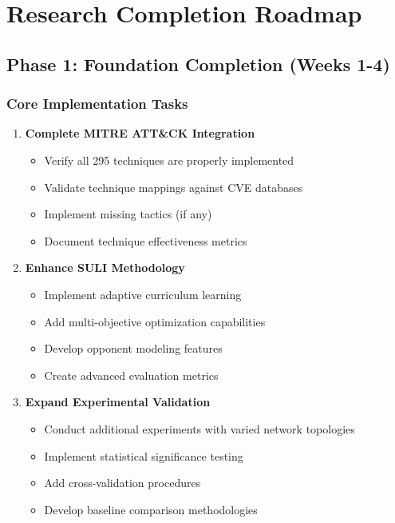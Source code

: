 \documentclass[12pt,a4paper]{article}
\begin{document}
\section{Research Completion Roadmap}

\subsection{Phase 1: Foundation Completion (Weeks 1-4)}

\subsubsection{Core Implementation Tasks}
\begin{enumerate}
    \item \textbf{Complete MITRE ATT\&CK Integration}
    \begin{itemize}
        \item Verify all 295 techniques are properly implemented
        \item Validate technique mappings against CVE databases
        \item Implement missing tactics (if any)
        \item Document technique effectiveness metrics
    \end{itemize}
    
    \item \textbf{Enhance SULI Methodology}
    \begin{itemize}
        \item Implement adaptive curriculum learning
        \item Add multi-objective optimization capabilities
        \item Develop opponent modeling features
        \item Create advanced evaluation metrics
    \end{itemize}
    
    \item \textbf{Expand Experimental Validation}
    \begin{itemize}
        \item Conduct additional experiments with varied network topologies
        \item Implement statistical significance testing
        \item Add cross-validation procedures
        \item Develop baseline comparison methodologies
    \end{itemize}
\end{enumerate}
\end{document}
